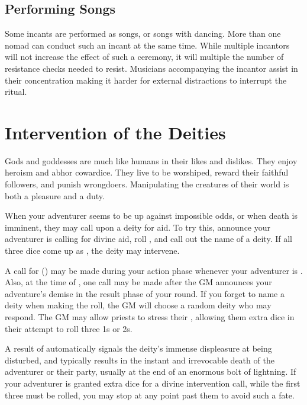 \begin{multicols*}{2}
\subsection{Performing Songs}
Some incants are performed as songs, or songs with dancing. More than one nomad can conduct such an incant at the same time. While multiple incantors will not increase the effect of such a ceremony, it will multiple the number of resistance checks needed to resist. Musicians accompanying the incantor assist in their concentration making it harder for external distractions to interrupt the ritual.

\section{Intervention of the Deities}
Gods and goddesses are much like humans in their likes and dislikes. They enjoy heroism and abhor cowardice. They live to be worshiped, reward their faithful followers, and punish wrongdoers. Manipulating the creatures of their world is both a pleasure and a duty.

When your adventurer seems to be up against impossible odds, or when death is imminent, they may call upon a deity for aid. To try this, announce your adventurer is calling for divine aid, roll , and call out the name of a deity. If all three dice come up as , the deity may intervene.

A call for  (\DI) may be made during your action phase whenever your adventurer is . Also, at the time of , one call may be made after the GM announces your adventure's demise in the result phase of your round. If you forget to name a deity when making the roll, the GM will choose a random deity who may respond. The GM may allow priests to stress their \CSE, allowing them extra dice in their attempt to roll three 1s or 2s.

A result of  automatically signals the deity's immense displeasure at being disturbed, and typically results in the instant and irrevocable death of the adventurer or their party, usually at the end of an enormous bolt of lightning. If your adventurer is granted extra dice for a divine intervention call, while the first three must be rolled, you may stop at any point past them to avoid such a fate.


\end{multicols*}
